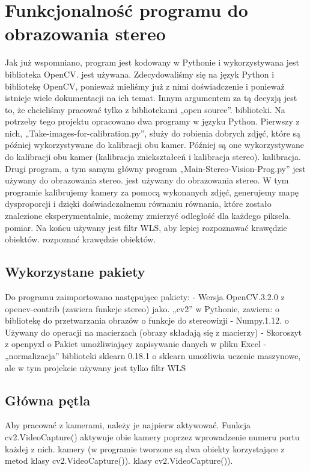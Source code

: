 \documentclass[magisterska]{pracadypl}
\begin{document}
\section{Funkcjonalność programu do obrazowania stereo}

Jak już wspomniano, program jest kodowany w Pythonie i wykorzystywana jest biblioteka OpenCV.
jest używana. Zdecydowaliśmy się na język Python i bibliotekę OpenCV, ponieważ
mieliśmy już z nimi doświadczenie i ponieważ istnieje wiele dokumentacji na ich temat. Innym
argumentem za tą decyzją jest to, że chcieliśmy pracować tylko z bibliotekami „open source”.
biblioteki.
Na potrzeby tego projektu opracowano dwa programy w języku Python.
Pierwszy z nich, „Take-images-for-calibration.py”, służy do robienia dobrych zdjęć, które są później wykorzystywane do kalibracji obu kamer.
Później są one wykorzystywane do kalibracji obu kamer (kalibracja zniekształceń i kalibracja stereo).
kalibracja.
Drugi program, a tym samym główny program „Main-Stereo-Vision-Prog.py” jest używany do obrazowania stereo.
jest używany do obrazowania stereo. W tym programie kalibrujemy kamery za pomocą wykonanych zdjęć, generujemy mapę dysproporcji i dzięki doświadczalnemu równaniu
równania, które zostało znalezione eksperymentalnie, możemy zmierzyć odległość dla każdego piksela.
pomiar. Na końcu używany jest filtr WLS, aby lepiej rozpoznawać krawędzie obiektów.
rozpoznać krawędzie obiektów.

\subsection{Wykorzystane pakiety}

Do programu zaimportowano następujące pakiety:
- Wersja OpenCV.3.2.0 z opencv-contrib (zawiera funkcje stereo) jako.
„cv2” w Pythonie, zawiera:
o bibliotekę do przetwarzania obrazów
o funkcje do stereowizji
- Numpy.1.12.
o Używany do operacji na macierzach (obrazy składają się z macierzy)
- Skoroszyt z openpyxl
o Pakiet umożliwiający zapisywanie danych w pliku Excel
- „normalizacja” biblioteki sklearn 0.18.1
o sklearn umożliwia uczenie maszynowe, ale w tym projekcie używany jest
tylko filtr WLS

\subsection{Główna pętla}

Aby pracować z kamerami, należy je najpierw aktywować. Funkcja
cv2.VideoCapture() aktywuje obie kamery poprzez wprowadzenie numeru portu każdej z nich.
kamery (w programie tworzone są dwa obiekty korzystające z metod klasy cv2.VideoCapture()).
klasy cv2.VideoCapture()).
\end{document}

